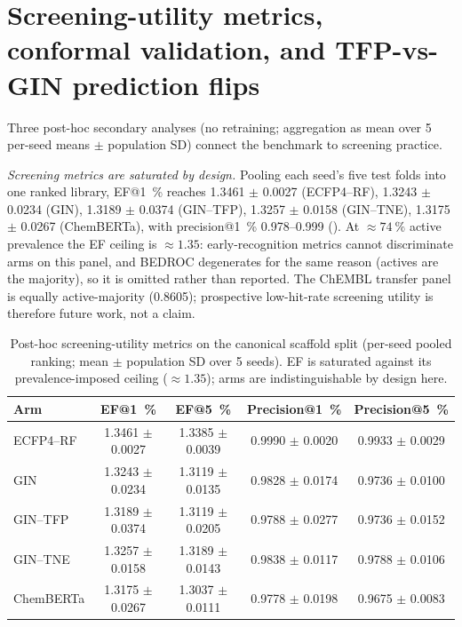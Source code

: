 \documentclass[11pt,a4paper]{article}
\begin{document}
\section{Screening-utility metrics, conformal validation, and TFP-vs-GIN prediction flips}
\label{sec:dd_utility_si}

Three post-hoc secondary analyses (no retraining; aggregation as mean over \num{5} per-seed means $\pm$ population SD) connect the benchmark to screening practice.

\textit{Screening metrics are saturated by design.} Pooling each seed's five test folds into one ranked library, EF@\qty{1}{\percent} reaches \num{1.3461} $\pm$ \num{0.0027} (ECFP4--RF), \num{1.3243} $\pm$ \num{0.0234} (GIN), \num{1.3189} $\pm$ \num{0.0374} (GIN--TFP), \num{1.3257} $\pm$ \num{0.0158} (GIN--TNE), \num{1.3175} $\pm$ \num{0.0267} (ChemBERTa), with precision@\qty{1}{\percent} \numrange{0.978}{0.999} (). At $\approx\qty{74}{\percent}$ active prevalence the EF ceiling is $\approx\num{1.35}$: early-recognition metrics cannot discriminate arms on this panel, and BEDROC degenerates for the same reason (actives are the majority), so it is omitted rather than reported. The ChEMBL transfer panel is equally active-majority (\num{0.8605}); prospective low-hit-rate screening utility is therefore future work, not a claim.

\begin{table}[h]
\centering
\caption{Post-hoc screening-utility metrics on the canonical scaffold split (per-seed pooled ranking; mean $\pm$ population SD over \num{5} seeds). EF is saturated against its prevalence-imposed ceiling ($\approx\num{1.35}$); arms are indistinguishable by design here.}
\label{tab:s7_screening}
\small
\begin{tabular}{lcccc}
\toprule
Arm & EF@\qty{1}{\percent} & EF@\qty{5}{\percent} & Precision@\qty{1}{\percent} & Precision@\qty{5}{\percent} \\
\midrule
ECFP4--RF & \num{1.3461} $\pm$ \num{0.0027} & \num{1.3385} $\pm$ \num{0.0039} & \num{0.9990} $\pm$ \num{0.0020} & \num{0.9933} $\pm$ \num{0.0029} \\
GIN & \num{1.3243} $\pm$ \num{0.0234} & \num{1.3119} $\pm$ \num{0.0135} & \num{0.9828} $\pm$ \num{0.0174} & \num{0.9736} $\pm$ \num{0.0100} \\
GIN--TFP & \num{1.3189} $\pm$ \num{0.0374} & \num{1.3119} $\pm$ \num{0.0205} & \num{0.9788} $\pm$ \num{0.0277} & \num{0.9736} $\pm$ \num{0.0152} \\
GIN--TNE & \num{1.3257} $\pm$ \num{0.0158} & \num{1.3189} $\pm$ \num{0.0143} & \num{0.9838} $\pm$ \num{0.0117} & \num{0.9788} $\pm$ \num{0.0106} \\
ChemBERTa & \num{1.3175} $\pm$ \num{0.0267} & \num{1.3037} $\pm$ \num{0.0111} & \num{0.9778} $\pm$ \num{0.0198} & \num{0.9675} $\pm$ \num{0.0083} \\
\bottomrule
\end{tabular}
\end{table}
\end{document}

